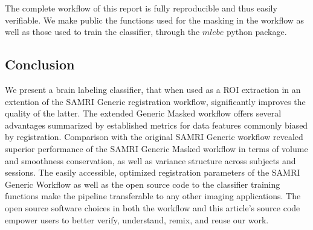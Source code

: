 The complete workflow of this report is fully reproducible and thus easily verifiable.
We make public the functions used for the masking in the workflow as well as those used to train the classifier, through the \textcolor{mg}{\texttt{$mlebe$}} \cite{mlebe} python package.

\subsection{Conclusion}

We present a brain labeling classifier, that when used as a ROI extraction in an extention of the SAMRI Generic registration workflow, significantly improves the quality of the latter.
The extended Generic Masked workflow offers several advantages summarized by established metrics for data features commonly biased by registration.
Comparison with the original SAMRI Generic workflow revealed superior performance of the SAMRI Generic Masked workflow in terms of volume and smoothness conservation, as well as variance structure across subjects and sessions.
The easily accessible, optimized registration parameters of the SAMRI Generic Workflow as well as the open source code to the classifier training functions make the pipeline transferable to any other imaging applications.
The open source software choices in both the workflow and this article's source code empower users to better verify, understand, remix, and reuse our work.
